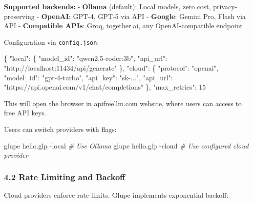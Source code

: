 \documentclass[11pt, a4paper]{article}
\newenvironment{Shaded}{\begin{snugshade}}{\end{snugshade}}
\newcommand{\AttributeTok}[1]{\textcolor[rgb]{0.77,0.63,0.00}{#1}}
\newcommand{\CommentTok}[1]{\textcolor[rgb]{0.56,0.35,0.01}{\textit{#1}}}
\newcommand{\DataTypeTok}[1]{\textcolor[rgb]{0.13,0.29,0.53}{#1}}
\newcommand{\DecValTok}[1]{\textcolor[rgb]{0.00,0.00,0.81}{#1}}
\newcommand{\ExtensionTok}[1]{#1}
\newcommand{\FunctionTok}[1]{\textcolor[rgb]{0.00,0.00,0.00}{#1}}
\newcommand{\NormalTok}[1]{#1}
\newcommand{\StringTok}[1]{\textcolor[rgb]{0.31,0.60,0.02}{#1}}
\begin{document}
\textbf{Supported backends:} - \textbf{Ollama} (default): Local models,
zero cost, privacy-preserving - \textbf{OpenAI}: GPT-4, GPT-5 via API -
\textbf{Google}: Gemini Pro, Flash via API - \textbf{Compatible APIs}:
Groq, together.ai, any OpenAI-compatible endpoint

Configuration via \texttt{config.json}:

\begin{Shaded}
\begin{Highlighting}[]
\FunctionTok{\{}
  \DataTypeTok{"local"}\FunctionTok{:} \FunctionTok{\{}
    \DataTypeTok{"model\_id"}\FunctionTok{:} \StringTok{"qwen2.5{-}coder:3b"}\FunctionTok{,}
    \DataTypeTok{"api\_url"}\FunctionTok{:} \StringTok{"http://localhost:11434/api/generate"}
  \FunctionTok{\},}
  \DataTypeTok{"cloud"}\FunctionTok{:} \FunctionTok{\{}
    \DataTypeTok{"protocol"}\FunctionTok{:} \StringTok{"openai"}\FunctionTok{,}
    \DataTypeTok{"model\_id"}\FunctionTok{:} \StringTok{"gpt{-}4{-}turbo"}\FunctionTok{,}
    \DataTypeTok{"api\_key"}\FunctionTok{:} \StringTok{"sk{-}..."}\FunctionTok{,}
    \DataTypeTok{"api\_url"}\FunctionTok{:} \StringTok{"https://api.openai.com/v1/chat/completions"}
  \FunctionTok{\},}
  \DataTypeTok{"max\_retries"}\FunctionTok{:} \DecValTok{15}
\end{Highlighting}
\end{Shaded}

This will open the browser in apifreellm.com website, where users can
access to free API keys.

Users can switch providers with flags:

\begin{Shaded}
\begin{Highlighting}[]
\ExtensionTok{glupe}\NormalTok{ hello.glp }\AttributeTok{{-}local}   \CommentTok{\# Use Ollama}
\ExtensionTok{glupe}\NormalTok{ hello.glp }\AttributeTok{{-}cloud}   \CommentTok{\# Use configured cloud provider}
\end{Highlighting}
\end{Shaded}

\subsubsection{4.2 Rate Limiting and
Backoff}\label{rate-limiting-and-backoff}

Cloud providers enforce rate limits. Glupe implements exponential
backoff:
\end{document}
